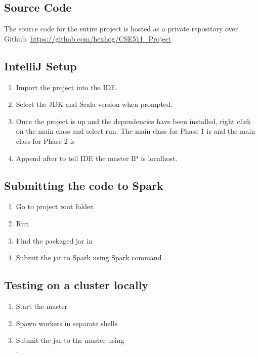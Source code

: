 \subsection{Source Code}
The source code for the entire project is hosted as a private repository over Github. \href{https://github.com/hexhog/CSE511_Project}{https://github.com/hexhog/CSE511\_Project}


\subsection{IntelliJ Setup}
\begin{enumerate}
\item Import the project into the IDE.
\item Select the JDK and Scala version when prompted.
\item Once the project is up and the dependencies have been installed, right click on the main class and select run. The main class for Phase 1 is  and the main class for Phase 2 is 
\item Append  after   to tell IDE the master IP is localhost.
\end{enumerate}

\subsection{Submitting the code to Spark}
\begin{enumerate}
    \item Go to project root folder.
    \item Run 
    \item Find the packaged jar in 
    \item Submit the jar to Spark using Spark command .
\end{enumerate}

\subsection{Testing on a cluster locally}
\begin{enumerate}
    \item Start the master 
    \item Spawn workers in separate shells \\ 
    \item Submit the jar to the master using \\ .
\end{enumerate}


